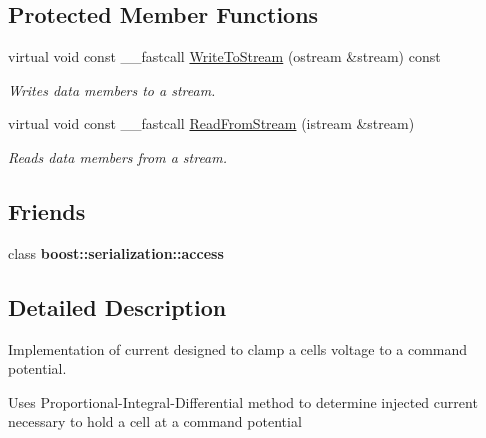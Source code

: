 \subsection*{Protected Member Functions}
\begin{DoxyCompactItemize}
\item 
\hypertarget{class_t_voltage_clamp___p_i_d___current_aa2a4a186d2c2ebf6c9742f200b81698f}{virtual void const \+\_\+\+\_\+fastcall \hyperlink{class_t_voltage_clamp___p_i_d___current_aa2a4a186d2c2ebf6c9742f200b81698f}{Write\+To\+Stream} (ostream \&stream) const }\label{class_t_voltage_clamp___p_i_d___current_aa2a4a186d2c2ebf6c9742f200b81698f}

\begin{DoxyCompactList}\small\item\em Writes data members to a stream. \end{DoxyCompactList}\item 
\hypertarget{class_t_voltage_clamp___p_i_d___current_a1f31d307ea90b6ffaf869fc7fa9d8886}{virtual void const \+\_\+\+\_\+fastcall \hyperlink{class_t_voltage_clamp___p_i_d___current_a1f31d307ea90b6ffaf869fc7fa9d8886}{Read\+From\+Stream} (istream \&stream)}\label{class_t_voltage_clamp___p_i_d___current_a1f31d307ea90b6ffaf869fc7fa9d8886}

\begin{DoxyCompactList}\small\item\em Reads data members from a stream. \end{DoxyCompactList}\end{DoxyCompactItemize}
\subsection*{Friends}
\begin{DoxyCompactItemize}
\item 
\hypertarget{class_t_voltage_clamp___p_i_d___current_ac98d07dd8f7b70e16ccb9a01abf56b9c}{class {\bfseries boost\+::serialization\+::access}}\label{class_t_voltage_clamp___p_i_d___current_ac98d07dd8f7b70e16ccb9a01abf56b9c}

\end{DoxyCompactItemize}


\subsection{Detailed Description}
Implementation of current designed to clamp a cells voltage to a command potential. 

Uses Proportional-\/\+Integral-\/\+Differential method to determine injected current necessary to hold a cell at a command potential

